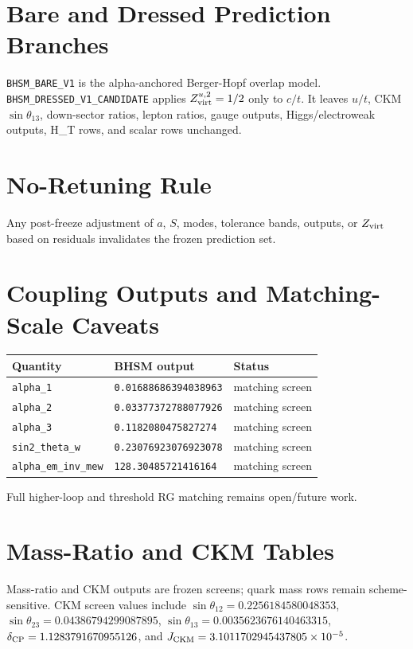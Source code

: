 \documentclass[11pt]{article}
\begin{document}
\section{Bare and Dressed Prediction Branches}
\texttt{BHSM\_BARE\_V1} is the alpha-anchored Berger-Hopf overlap model. \texttt{BHSM\_DRESSED\_V1\_CANDIDATE} applies \(Z_{\rm virt}^{u,2}=1/2\) only to \(c/t\). It leaves \(u/t\), CKM \(\sin\theta_{13}\), down-sector ratios, lepton ratios, gauge outputs, Higgs/electroweak outputs, H\_T rows, and scalar rows unchanged.

\section{No-Retuning Rule}
Any post-freeze adjustment of \(a\), \(S\), modes, tolerance bands, outputs, or \(Z_{\rm virt}\) based on residuals invalidates the frozen prediction set.

\section{Coupling Outputs and Matching-Scale Caveats}
\begin{center}
\begin{tabular}{lll}
\toprule
Quantity & BHSM output & Status\\
\midrule
\texttt{alpha\_1} & \texttt{0.01688686394038963} & matching screen\\
\texttt{alpha\_2} & \texttt{0.03377372788077926} & matching screen\\
\texttt{alpha\_3} & \texttt{0.1182080475827274} & matching screen\\
\texttt{sin2\_theta\_w} & \texttt{0.23076923076923078} & matching screen\\
\texttt{alpha\_em\_inv\_mew} & \texttt{128.30485721416164} & matching screen\\
\bottomrule
\end{tabular}
\end{center}
Full higher-loop and threshold RG matching remains open/future work.

\section{Mass-Ratio and CKM Tables}
Mass-ratio and CKM outputs are frozen screens; quark mass rows remain scheme-sensitive. CKM screen values include \(\sin\theta_{12}=0.2256184580048353\), \(\sin\theta_{23}=0.04386794299087895\), \(\sin\theta_{13}=0.0035623676140463315\), \(\delta_{\rm CP}=1.1283791670955126\), and \(J_{\rm CKM}=3.1011702945437805\times10^{-5}\).
\end{document}
